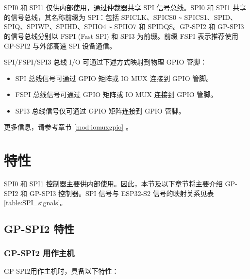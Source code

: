 \documentclass[main\_\_CN.tex]{subfiles}
\begin{document}
SPI0 和 SPI1 仅供内部使用，通过仲裁器共享 SPI 信号总线。SPI0 和 SPI1 共享的信号总线，其名称前缀为 SPI：包括 SPICLK、SPICS0 \verb+~+ SPICS1、SPID、SPIQ、SPIWP、SPIHD、SPIIO4 \verb+~+ SPIIO7 和 SPIDQS。GP-SPI2 和 GP-SPI3 的信号总线分别以 FSPI (Fast SPI) 和 SPI3 为前缀。前缀 FSPI 表示推荐使用 GP-SPI2 与外部高速 SPI 设备通信。

SPI/FSPI/SPI3 总线 I/O 可通过下述方式映射到物理 GPIO 管脚：

\begin{itemize}
  \item SPI 总线信号可通过 GPIO 矩阵或 IO MUX 连接到 GPIO 管脚。
  \item FSPI 总线信号可通过 GPIO 矩阵或 IO MUX 连接到 GPIO 管脚。
  \item SPI3 总线信号仅可通过 GPIO 矩阵连接到 GPIO 管脚。
\end{itemize}

更多信息，请参考章节 \ref{mod:iomuxgpio} \textit{}。

\section{特性}

SPI0 和 SPI1 控制器主要供内部使用。因此，本节及以下章节将主要介绍 GP-SPI2 和 GP-SPI3 控制器。SPI 信号与 ESP32-S2 信号的映射关系见表 \ref{table:SPI_signals}。


\subsection{GP-SPI2 特性}

\subsubsection{GP-SPI2 用作主机}

GP-SPI2用作主机时，具备以下特性：
\end{document}
